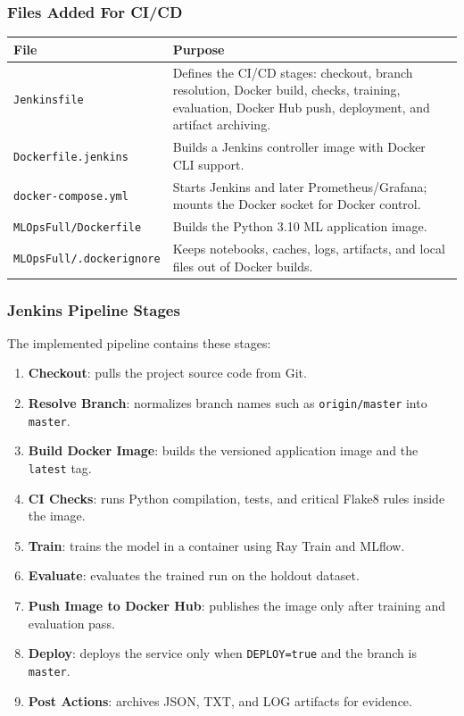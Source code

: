\documentclass[11pt,a4paper]{article}
\begin{document}
\subsubsection{Files Added For CI/CD}

\begin{longtable}{p{} p{}}
\toprule
\textbf{File} & \textbf{Purpose} \\
\midrule
\texttt{Jenkinsfile} & Defines the CI/CD stages: checkout, branch resolution, Docker build, checks, training, evaluation, Docker Hub push, deployment, and artifact archiving. \\
\texttt{Dockerfile.jenkins} & Builds a Jenkins controller image with Docker CLI support. \\
\texttt{docker-compose.yml} & Starts Jenkins and later Prometheus/Grafana; mounts the Docker socket for Docker control. \\
\texttt{MLOpsFull/Dockerfile} & Builds the Python 3.10 ML application image. \\
\texttt{MLOpsFull/.dockerignore} & Keeps notebooks, caches, logs, artifacts, and local files out of Docker builds. \\
\bottomrule
\end{longtable}

\subsubsection{Jenkins Pipeline Stages}

The implemented pipeline contains these stages:

\begin{enumerate}
    \item \textbf{Checkout}: pulls the project source code from Git.
    \item \textbf{Resolve Branch}: normalizes branch names such as \texttt{origin/master} into \texttt{master}.
    \item \textbf{Build Docker Image}: builds the versioned application image and the \texttt{latest} tag.
    \item \textbf{CI Checks}: runs Python compilation, tests, and critical Flake8 rules inside the image.
    \item \textbf{Train}: trains the model in a container using Ray Train and MLflow.
    \item \textbf{Evaluate}: evaluates the trained run on the holdout dataset.
    \item \textbf{Push Image to Docker Hub}: publishes the image only after training and evaluation pass.
    \item \textbf{Deploy}: deploys the service only when \texttt{DEPLOY=true} and the branch is \texttt{master}.
    \item \textbf{Post Actions}: archives JSON, TXT, and LOG artifacts for evidence.
\end{enumerate}
\end{document}
